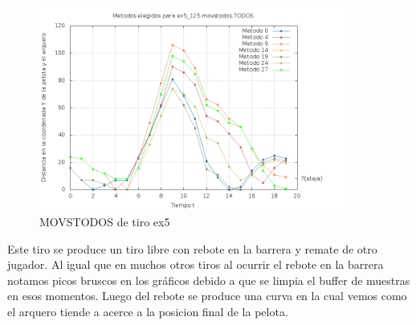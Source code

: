 \begin{figure}[H]
\begin{center}
\includegraphics[width=0.9\textwidth]{img/ex5_125_movstodos_TODOS_elegidos.png}
     \caption{MOVSTODOS de tiro ex5}
\end{center}
\end{figure}

Este tiro se produce un tiro libre con rebote en la barrera y remate de otro jugador. Al igual que
en muchos otros tiros al ocurrir el rebote en la barrera notamos picos bruscos en los gráficos
debido a que se limpia el buffer de muestras en esos momentos. Luego del rebote se produce una curva
en la cual vemos como el arquero tiende a acerce a la posicion final de la pelota.
